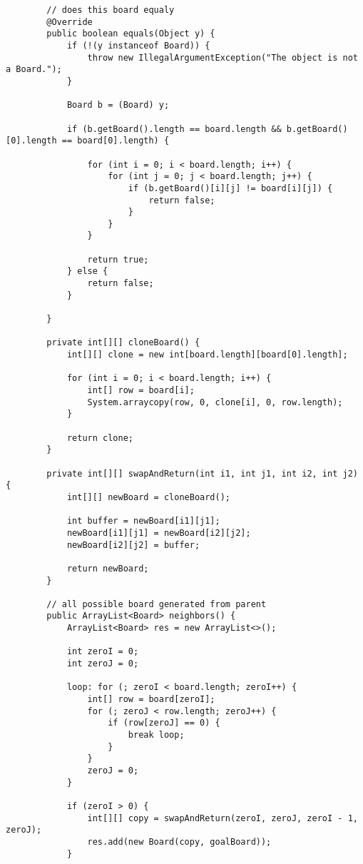 \documentclass[paper=a4, fontsize=11pt]{scrartcl} %
\numberwithin{equation}{section} %
\numberwithin{figure}{section} %
\numberwithin{table}{section} %
\begin{document}
\begin{lstlisting}
        // does this board equaly
        @Override
        public boolean equals(Object y) {
            if (!(y instanceof Board)) {
                throw new IllegalArgumentException("The object is not a Board.");
            }

            Board b = (Board) y;

            if (b.getBoard().length == board.length && b.getBoard()[0].length == board[0].length) {

                for (int i = 0; i < board.length; i++) {
                    for (int j = 0; j < board.length; j++) {
                        if (b.getBoard()[i][j] != board[i][j]) {
                            return false;
                        }
                    }
                }

                return true;
            } else {
                return false;
            }

        }

        private int[][] cloneBoard() {
            int[][] clone = new int[board.length][board[0].length];

            for (int i = 0; i < board.length; i++) {
                int[] row = board[i];
                System.arraycopy(row, 0, clone[i], 0, row.length);
            }

            return clone;
        }

        private int[][] swapAndReturn(int i1, int j1, int i2, int j2) {
            int[][] newBoard = cloneBoard();

            int buffer = newBoard[i1][j1];
            newBoard[i1][j1] = newBoard[i2][j2];
            newBoard[i2][j2] = buffer;

            return newBoard;
        }

        // all possible board generated from parent
        public ArrayList<Board> neighbors() {
            ArrayList<Board> res = new ArrayList<>();

            int zeroI = 0;
            int zeroJ = 0;

            loop: for (; zeroI < board.length; zeroI++) {
                int[] row = board[zeroI];
                for (; zeroJ < row.length; zeroJ++) {
                    if (row[zeroJ] == 0) {
                        break loop;
                    }
                }
                zeroJ = 0;
            }

            if (zeroI > 0) {
                int[][] copy = swapAndReturn(zeroI, zeroJ, zeroI - 1, zeroJ);
                res.add(new Board(copy, goalBoard));
            }


\end{lstlisting}
\end{document}
